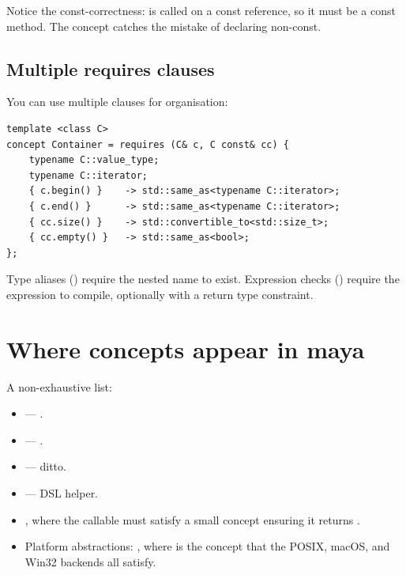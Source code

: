 Notice the const-correctness:  is called on a
const reference, so it must be a const method. The concept
catches the mistake of declaring  non-const.

\subsection*{Multiple requires clauses}

You can use multiple  clauses for organisation:

\begin{lstlisting}
template <class C>
concept Container = requires (C& c, C const& cc) {
    typename C::value_type;
    typename C::iterator;
    { c.begin() }    -> std::same_as<typename C::iterator>;
    { c.end() }      -> std::same_as<typename C::iterator>;
    { cc.size() }    -> std::convertible_to<std::size_t>;
    { cc.empty() }   -> std::same_as<bool>;
};
\end{lstlisting}

Type aliases () require the nested
name to exist. Expression checks () require the
expression to compile, optionally with a return type constraint.

\section{Where concepts appear in maya}

A non-exhaustive list:

\begin{itemize}[leftmargin=*]
  \item {} ---
    .
  \item {}
    --- .
  \item {}
    --- ditto.
  \item {} ---
    DSL helper.
  \item {}, where
    the callable must satisfy a small concept ensuring it returns
    .
  \item Platform abstractions: , where  is the concept that the
    POSIX, macOS, and Win32 backends all satisfy.
\end{itemize}

